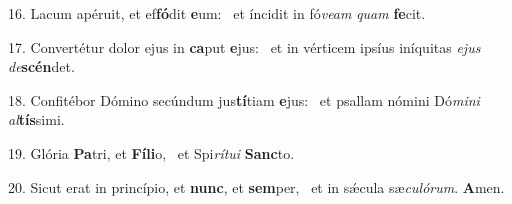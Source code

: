 16. Lacum apéruit, et ef\textbf{fó}dit \textbf{e}um: \ast\  et íncidit in fó\textit{ve}\textit{am} \textit{quam} \textbf{fe}cit.\

17. Convertétur dolor ejus in \textbf{ca}put \textbf{e}jus: \ast\  et in vérticem ipsíus iníquitas \textit{e}\textit{jus} \textit{de}\textbf{scén}det.\

18. Confitébor Dómino secúndum jus\textbf{tí}tiam \textbf{e}jus: \ast\  et psallam nómini Dó\textit{mi}\textit{ni} \textit{al}\textbf{tís}simi.\

19. Glória \textbf{Pa}tri, et \textbf{Fí}\textbf{li}o, \ast\  et Spi\textit{rí}\textit{tu}\textit{i} \textbf{Sanc}to.\

20. Sicut erat in princípio, et \textbf{nunc}, et \textbf{sem}per, \ast\  et in sǽcula sæ\textit{cu}\textit{ló}\textit{rum}. \textbf{A}men.\

